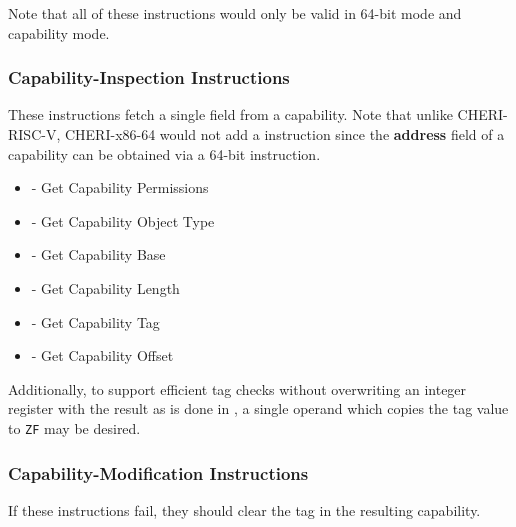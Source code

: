 Note that all of these instructions would only be valid in 64-bit mode
and capability mode.

\subsubsection{Capability-Inspection Instructions}

These instructions fetch a single field from a capability.
Note that unlike CHERI-RISC-V, CHERI-x86-64 would not add a
 instruction since the \textbf{address} field of a
capability can be obtained via a 64-bit  instruction.

\begin{itemize}
  \item {} - Get Capability Permissions
  \item {} - Get Capability Object Type
  \item {} - Get Capability Base
  \item {} - Get Capability Length
  \item {} - Get Capability Tag
  \item {} - Get Capability Offset
\end{itemize}

Additionally, to support efficient tag checks without overwriting an
integer register with the result as is done in , a
single operand  which copies the tag value to
\texttt{ZF} may be desired.

\subsubsection{Capability-Modification Instructions}

If these instructions fail, they should clear the tag in the resulting
capability.

